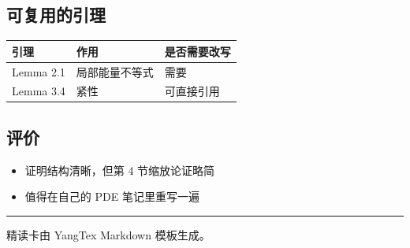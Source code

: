 \documentclass[UTF8,a4paper,11pt,fontset=fandol]{ctexart}
\begin{document}
\subsection{可复用的引理}

\begin{center}
\begin{tabular}{l|l|l}
\hline
引理 & 作用 & 是否需要改写 \\
\hline
Lemma 2.1 & 局部能量不等式 & 需要 \\
Lemma 3.4 & 紧性 & 可直接引用 \\
\hline
\end{tabular}
\end{center}

\subsection{评价}

\begin{itemize}
  \item 证明结构清晰，但第 4 节缩放论证略简
  \item 值得在自己的 PDE 笔记里重写一遍
\end{itemize}

\par\noindent\rule{\textwidth}{0.4pt}\par

精读卡由 YangTex Markdown 模板生成。
\end{document}
